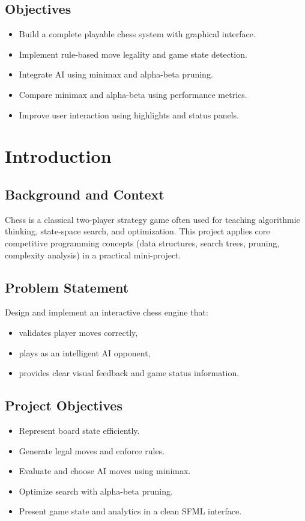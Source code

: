 \documentclass[12pt,a4paper]{article}
\begin{document}
\subsection{Objectives}
\begin{itemize}
    \item Build a complete playable chess system with graphical interface.
    \item Implement rule-based move legality and game state detection.
    \item Integrate AI using minimax and alpha-beta pruning.
    \item Compare minimax and alpha-beta using performance metrics.
    \item Improve user interaction using highlights and status panels.
\end{itemize}

\section{Introduction}
\subsection{Background and Context}
Chess is a classical two-player strategy game often used for teaching algorithmic thinking, state-space search, and optimization. This project applies core competitive programming concepts (data structures, search trees, pruning, complexity analysis) in a practical mini-project.

\subsection{Problem Statement}
Design and implement an interactive chess engine that:
\begin{itemize}
    \item validates player moves correctly,
    \item plays as an intelligent AI opponent,
    \item provides clear visual feedback and game status information.
\end{itemize}

\subsection{Project Objectives}
\begin{itemize}
    \item Represent board state efficiently.
    \item Generate legal moves and enforce rules.
    \item Evaluate and choose AI moves using minimax.
    \item Optimize search with alpha-beta pruning.
    \item Present game state and analytics in a clean SFML interface.
\end{itemize}
\end{document}
